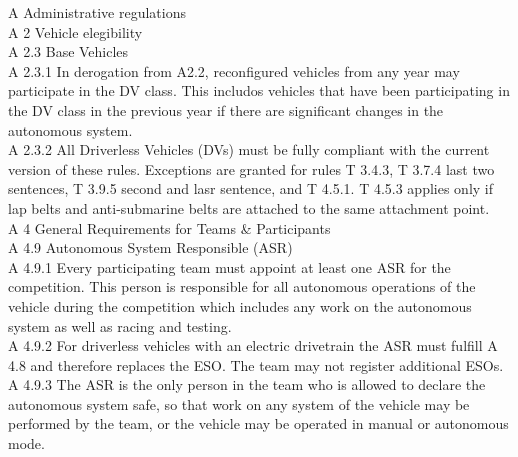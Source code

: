\documentclass{article}
\begin{document}
%
%

A Administrative regulations\\

A 2 Vehicle elegibility\\

A 2.3 Base Vehicles\\

A 2.3.1 In derogation from A2.2, reconfigured vehicles from any year may participate in the DV class. This includos vehicles that have been participating in the DV class in the previous year if there are significant changes in the autonomous system.\\

A 2.3.2 All Driverless Vehicles (DVs) must be fully compliant with the current version of these rules. Exceptions are granted for rules T 3.4.3, T 3.7.4 last two sentences, T 3.9.5 second and lasr sentence, and T 4.5.1. T 4.5.3 applies only if lap belts and anti-submarine belts are attached to the same attachment point.\\

A 4 General Requirements for Teams & Participants\\

A 4.9 Autonomous System Responsible (ASR)\\

A 4.9.1 Every participating team must appoint at least one ASR for the competition. This person is responsible for all autonomous operations of the vehicle during the competition which includes any work on the autonomous system as well as racing and testing.\\

A 4.9.2 For driverless vehicles with an electric drivetrain the ASR must fulfill A 4.8 and therefore replaces the ESO. The team may not register additional ESOs.\\

A 4.9.3 The ASR is the only person in the team who is allowed to declare the autonomous system safe, so that work on any system of the vehicle may be performed by the team, or the vehicle may be operated in manual or autonomous mode.\\
\end{document}
